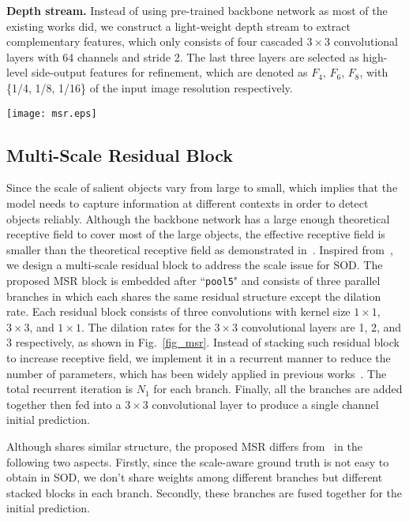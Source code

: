 \documentclass[runningheads]{llncs}
\begin{document}
\textbf{Depth stream.} Instead of using pre-trained backbone network as most of the existing works did, we construct a light-weight depth stream to extract complementary features, which only consists of four cascaded $3\times3$ convolutional layers with 64 channels and stride 2. The last three layers are selected as high-level side-output features for refinement, which are denoted as $F_{4}$, $F_{6}$, $F_{8}$, with \{1/4, 1/8, 1/16\} of the input image resolution respectively.

\begin{figure*}  
  \centering  
  \texttt{[image: msr.eps]}
  \caption{The proposed multi-scale residual block. ``$d$" denotes dilation rate.}  
  \label{fig_msr}  
\end{figure*}


\subsection{Multi-Scale Residual Block}
Since the scale of salient objects vary from large to small, which implies that the model needs to capture information at different contexts in order to detect objects reliably. Although the backbone network has a large enough theoretical receptive field to cover most of the large objects, the effective receptive field is smaller than the theoretical receptive field as demonstrated in~\cite{luo2016understanding}. Inspired from~\cite{li2019scale}, we design a multi-scale residual block to address the scale issue for SOD. The proposed MSR block is embedded after ``\texttt{pool5}" and consists of three parallel branches in which each shares the same residual structure except the dilation rate. Each residual block consists of three convolutions with kernel size $1\times1$, $3\times3$, and $1\times1$. The dilation rates for the $3\times3$ convolutional layers are 1, 2, and 3 respectively, as shown in Fig.~\ref{fig_msr}. Instead of stacking such residual block to increase receptive field, we implement it in a recurrent manner to reduce the number of parameters, which has been widely applied in previous works~\cite{zhang2018progressive}\cite{deng2018r3net}\cite{li2018recurrent}. The total recurrent iteration is $N_{1}$ for each branch. Finally, all the branches are added together then fed into a $3\times3$ convolutional layer to produce a single channel initial prediction.

Although shares similar structure, the proposed MSR differs from~\cite{li2019scale} in the following two aspects. Firstly, since the scale-aware ground truth is not easy to obtain in SOD, we don't share weights among different branches but different stacked blocks in each branch. Secondly, these branches are fused together for the initial prediction. 
\end{document}
